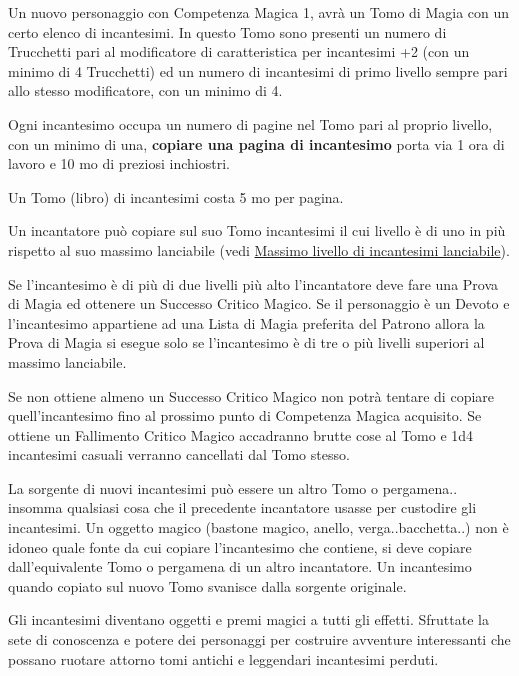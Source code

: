 \begin{multicols}{2}
Un nuovo personaggio con Competenza Magica 1, avrà un Tomo di Magia con un certo elenco di incantesimi. In questo Tomo sono presenti un numero di Trucchetti pari al modificatore di caratteristica per incantesimi +2 (con un minimo di 4 Trucchetti) ed un numero di incantesimi di primo livello sempre pari allo stesso modificatore, con un minimo di 4.\label{tomocm1}\hypertarget{tomocm1}{}

Ogni incantesimo occupa un numero di pagine nel Tomo pari al proprio livello, con un minimo di una, \textbf{copiare una pagina di incantesimo} porta via 1 ora di lavoro e 10 mo di preziosi inchiostri.

Un Tomo (libro) di incantesimi costa 5 mo per pagina.


Un incantatore può copiare sul suo Tomo incantesimi il cui livello è di uno in più rispetto al suo massimo lanciabile (vedi \hyperlink{scuoleelivelli}{Massimo livello di incantesimi lanciabile}).

Se l'incantesimo è di più di due livelli più alto l'incantatore deve fare una Prova di Magia ed ottenere un Successo Critico Magico. Se il personaggio è un Devoto e l'incantesimo appartiene ad una Lista di Magia preferita del Patrono allora la Prova di Magia si esegue solo se l'incantesimo è di tre o più livelli superiori al massimo lanciabile.

Se non ottiene almeno un Successo Critico Magico non potrà tentare di copiare quell'incantesimo fino al prossimo punto di Competenza Magica acquisito. Se ottiene un Fallimento Critico Magico accadranno brutte cose al Tomo e 1d4 incantesimi casuali verranno cancellati dal Tomo stesso.

La sorgente di nuovi incantesimi può essere un altro Tomo o pergamena.. insomma qualsiasi cosa che il precedente incantatore usasse per custodire gli incantesimi. Un oggetto magico (bastone magico, anello, verga..bacchetta..) non è idoneo quale fonte da cui copiare l'incantesimo che contiene, si deve copiare dall'equivalente Tomo o pergamena di un altro incantatore. Un incantesimo quando copiato sul nuovo Tomo svanisce dalla sorgente originale.

\begin{changemargin}{0.3cm}{0.3cm}\begin{narratore}
Gli incantesimi diventano oggetti e premi magici a tutti gli effetti. Sfruttate la sete di conoscenza e potere dei personaggi per costruire avventure interessanti che possano ruotare attorno tomi antichi e leggendari incantesimi perduti.
\end{narratore}\end{changemargin}


\end{multicols}
